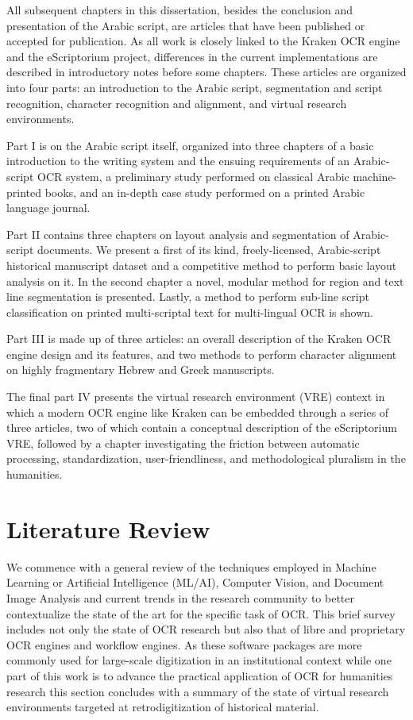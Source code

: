 All subsequent chapters in this dissertation, besides the conclusion and
presentation of the Arabic script, are articles that have been published or
accepted for publication. As all work is closely linked to the Kraken OCR
engine and the eScriptorium project, differences in the current implementations
are described in introductory notes before some chapters. These articles are
organized into four parts: an introduction to the Arabic script, segmentation
and script recognition, character recognition and alignment, and virtual research
environments.

Part I is on the Arabic script itself, organized into three chapters of a basic
introduction to the writing system and the ensuing requirements of an
Arabic-script OCR system, a preliminary study performed on classical Arabic
machine-printed books, and an in-depth case study performed on a printed Arabic
language journal.

Part II contains three chapters on layout analysis and segmentation of
Arabic-script documents. We present a first of its kind, freely-licensed,
Arabic-script historical manuscript dataset and a competitive method to perform
basic layout analysis on it. In the second chapter a novel, modular method for
region and text line segmentation is presented. Lastly, a method to perform
sub-line script classification on printed multi-scriptal text for multi-lingual
OCR is shown.

Part III is made up of three articles: an overall description of the Kraken OCR
engine design and its features, and two methods to perform character alignment
on highly fragmentary Hebrew and Greek manuscripts.

The final part IV presents the virtual research environment (VRE) context in
which a modern OCR engine like Kraken can be embedded through a series of three
articles, two of which contain a conceptual description of the eScriptorium
VRE, followed by a chapter investigating the friction between automatic
processing, standardization, user-friendliness, and methodological pluralism in
the humanities. 

\section{Literature Review}

We commence with a general review of the techniques employed in Machine
Learning or Artificial Intelligence (ML/AI), Computer Vision, and Document
Image Analysis and current trends in the research community to better
contextualize the state of the art for the specific task of OCR. This brief
survey includes not only the state of OCR research but also that of libre and
proprietary OCR engines and workflow engines. As these software packages are
more commonly used for large-scale digitization in an institutional context
while one part of this work is to advance the practical application of OCR for
humanities research this section concludes with a summary of the state of
virtual research environments targeted at retrodigitization of historical
material.

